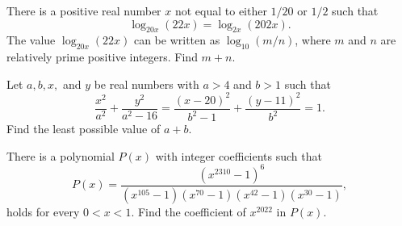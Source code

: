 \documentclass[11pt]{article}
\theoremstyle{definition}
\begin{document}
%	












\begin{question}[name={2022 AIME II, \href{https://artofproblemsolving.com/community/c4p24447420}{Problem 4}}]
	There is a positive real number $x$ not equal to either ${1}/{20}$ or ${1}/{2}$ such that
	$$\log_{20x} (22x)=\log_{2x} (202x).$$
	The value $\log_{20x} (22x)$ can be written as $\log_{10} ({m}/{n})$, where $m$ and $n$ are relatively prime positive integers. Find $m+n$.
\end{question}


%	














\begin{question}[name={2022 AIME II, \href{https://artofproblemsolving.com/community/c4p24447217}{Problem 12}}]
	Let $a, b, x,$ and $y$ be real numbers with $a>4$ and $b>1$ such that
	$$\frac{x^2}{a^2}+\frac{y^2}{a^2-16}=\frac{(x-20)^2}{b^2-1}+\frac{(y-11)^2}{b^2}=1.$$
	Find the least possible value of $a+b$.
\end{question}


%	








\begin{question}[name={2022 AIME II, \href{https://artofproblemsolving.com/community/c4p24447196}{Problem 13}}]
	There is a polynomial $P(x)$ with integer coefficients such that
	$$P(x)=\frac{(x^{2310}-1)^6}{(x^{105}-1)(x^{70}-1)(x^{42}-1)(x^{30}-1)},$$
	holds for every $0<x<1$. Find the coefficient of $x^{2022}$ in $P(x)$.
\end{question}


%	
\end{document}
